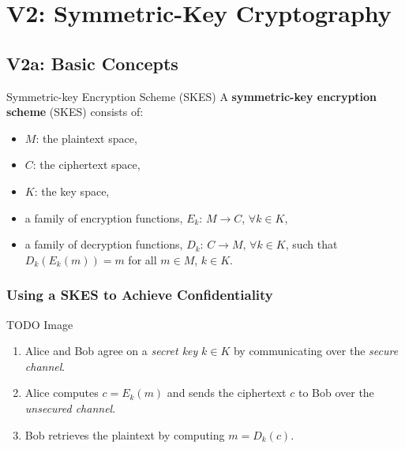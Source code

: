 \chapter*{V2: Symmetric-Key Cryptography}
\setcounter{chapter}{1}

\section*{V2a: Basic Concepts}
\setcounter{section}{1}

\begin{Definition}{Symmetric-key Encryption Scheme (SKES)}{}
      A \textbf{symmetric-key encryption scheme} (SKES) consists of:
      \begin{itemize}
            \item $ M $: the plaintext space,
            \item $ C $: the ciphertext space,
            \item $ K $: the key space,
            \item a family of encryption functions, $ E_k $: $ M\to C $,
                  $ \forall k\in K $,
            \item a family of decryption functions, $ D_k $: $ C\to M $,
                  $ \forall k \in K $, such that $ D_k(E_k(m))=m $ for
                  all $ m\in M $, $ k\in K $.
      \end{itemize}
\end{Definition}
\subsection*{Using a SKES to Achieve Confidentiality}
TODO Image
\begin{enumerate}
      \item Alice and Bob agree on a \emph{secret key} $ k\in K $
            by communicating over the \emph{secure channel}.
      \item Alice computes $ c=E_k(m) $ and sends the ciphertext
            $ c $ to Bob over the \emph{unsecured channel}.
      \item Bob retrieves the plaintext by computing $ m=D_k(c) $.
\end{enumerate}

